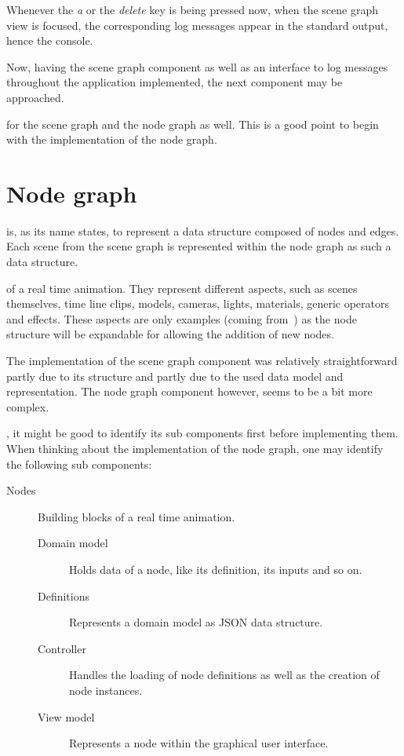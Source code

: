 \documentclass[%
    a4paper,    %
    justified,  %
    nobib,      %
    openany     %
]{tufte-book}
\begin{document}
Whenever the \textit{a} or the \textit{delete} key is being pressed now, when
the scene graph view is focused, the corresponding log messages appear in the
standard output, hence the console.

Now, having the scene graph component as well as an interface to log messages
throughout the application implemented, the next component may be approached.

 for the scene graph and the node graph as
well. This is a good point to begin with the implementation of the node graph.


\chapter{Node graph}
\label{appendix:chap:node-graph}

 is, as its name states, to
represent a data structure composed of nodes and edges. Each scene from the
scene graph is represented within the node graph as such a data structure.

 of a real time animation. They
represent different aspects, such as scenes themselves, time line clips, models,
cameras, lights, materials, generic operators and effects. These aspects are
only examples (coming from~) as
the node structure will be expandable for allowing the addition of new nodes.

The implementation of the scene graph component was relatively straightforward
partly due to its structure and partly due to the used data model and
representation. The node graph component however, seems to be a bit more complex.

, it might be
good to identify its sub components first before implementing them. When
thinking about the implementation of the node graph, one may identify the
following sub components:

\begin{description}
\item[Nodes] Building blocks of a real time animation.
  \begin{description}
    \item[Domain model] Holds data of a node, like its definition, its inputs
                        and so on.
    \item[Definitions]  Represents a domain model as JSON data structure.
    \item[Controller]   Handles the loading of node definitions as well as the
                        creation of node instances.
    \item[View model]   Represents a node within the graphical user interface.
  \end{description}
\end{description}
\end{document}

